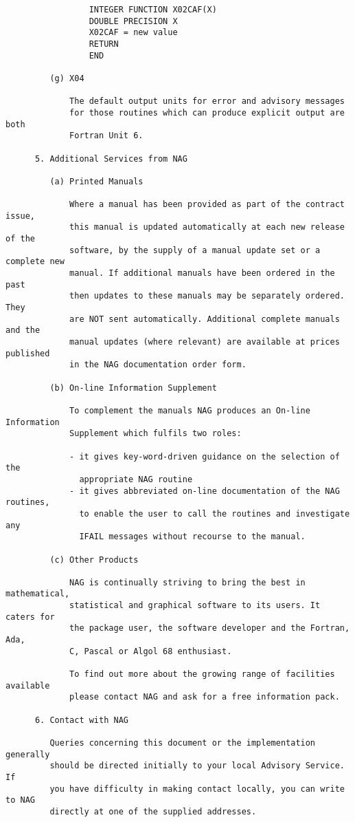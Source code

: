 \begin{small}
\begin{verbatim}
                 INTEGER FUNCTION X02CAF(X)
                 DOUBLE PRECISION X
                 X02CAF = new value
                 RETURN
                 END

         (g) X04

             The default output units for error and advisory messages
             for those routines which can produce explicit output are both
             Fortran Unit 6.

      5. Additional Services from NAG

         (a) Printed Manuals

             Where a manual has been provided as part of the contract issue,
             this manual is updated automatically at each new release of the
             software, by the supply of a manual update set or a complete new
             manual. If additional manuals have been ordered in the past
             then updates to these manuals may be separately ordered. They
             are NOT sent automatically. Additional complete manuals and the
             manual updates (where relevant) are available at prices published
             in the NAG documentation order form.

         (b) On-line Information Supplement

             To complement the manuals NAG produces an On-line Information
             Supplement which fulfils two roles:

             - it gives key-word-driven guidance on the selection of the
               appropriate NAG routine
             - it gives abbreviated on-line documentation of the NAG routines,
               to enable the user to call the routines and investigate any
               IFAIL messages without recourse to the manual.

         (c) Other Products

             NAG is continually striving to bring the best in mathematical,
             statistical and graphical software to its users. It caters for
             the package user, the software developer and the Fortran, Ada,
             C, Pascal or Algol 68 enthusiast.

             To find out more about the growing range of facilities available
             please contact NAG and ask for a free information pack.

      6. Contact with NAG

         Queries concerning this document or the implementation generally
         should be directed initially to your local Advisory Service.  If
         you have difficulty in making contact locally, you can write to NAG
         directly at one of the supplied addresses.


\end{verbatim}
\end{small}
